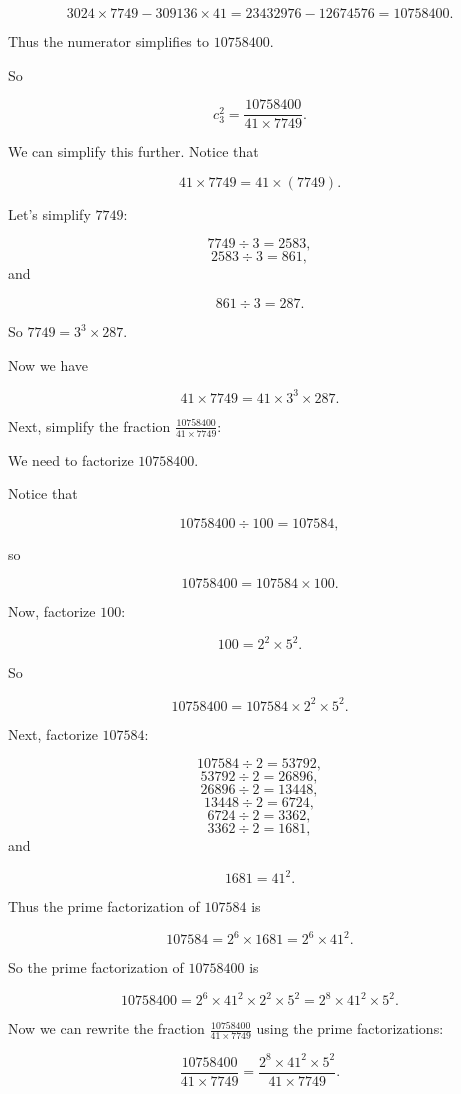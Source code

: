 \[ 3024 \times 7749 - 309136 \times 41 = 23432976 - 12674576 = 10758400. \]

Thus the numerator simplifies to $10758400$.

So 

\[ c_3^2 = \frac{10758400}{41 \times 7749}. \]

We can simplify this further. Notice that

\[ 41 \times 7749 = 41 \times (7749). \]

Let's simplify $7749$:

\[ 7749 \div 3 = 2583, \]
\[ 2583 \div 3 = 861, \]
and 

\[ 861 \div 3 = 287. \]

So $7749 = 3^3 \times 287.$

Now we have 

\[ 41 \times 7749 = 41 \times 3^3 \times 287. \]

Next, simplify the fraction $\frac{10758400}{41 \times 7749}$:

We need to factorize $10758400$.

Notice that 

\[ 10758400 \div 100 = 107584, \]

so 

\[ 10758400 = 107584 \times 100. \]

Now, factorize $100$:

\[ 100 = 2^2 \times 5^2. \]

So 

\[ 10758400 = 107584 \times 2^2 \times 5^2. \]

Next, factorize $107584$:

\[ 107584 \div 2 = 53792, \]
\[ 53792 \div 2 = 26896, \]
\[ 26896 \div 2 = 13448, \]
\[ 13448 \div 2 = 6724, \]
\[ 6724 \div 2 = 3362, \]
\[ 3362 \div 2 = 1681, \]
and 

\[ 1681 = 41^2. \]

Thus the prime factorization of $107584$ is 

\[ 107584 = 2^6 \times 1681 = 2^6 \times 41^2. \]

So the prime factorization of $10758400$ is

\[ 10758400 = 2^6 \times 41^2 \times 2^2 \times 5^2 = 2^8 \times 41^2 \times 5^2. \]

Now we can rewrite the fraction $\frac{10758400}{41 \times 7749}$ using the prime factorizations:

\[ \frac{10758400}{41 \times 7749} = \frac{2^8 \times 41^2 \times 5^2}{41 \times 7749}. \]

